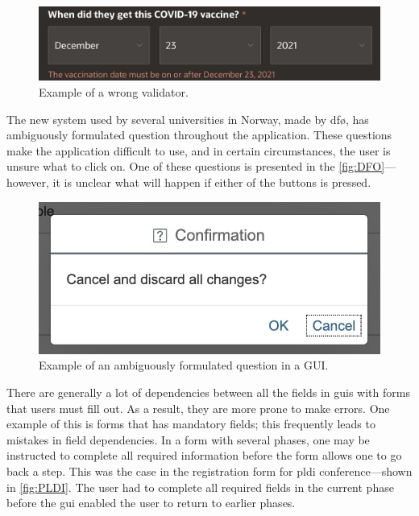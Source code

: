 \begin{figure}
    \centering
    \includegraphics[scale=0.35, frame]{figures/vaccine.jpeg}
    \caption{Example of a wrong validator.}
    \label{fig:vaccine}
\end{figure}

The new system used by several universities in Norway, made by \gls{dfø}, has ambiguously formulated question throughout the application. These questions make the application difficult to use, and in certain circumstances, the user is unsure what to click on. One of these questions is presented in the \autoref{fig:DFO}---however, it is unclear what will happen if either of the buttons is pressed.

\begin{figure}[h]
    \centering
    \includegraphics[scale=0.55, frame]{figures/DFO.jpg}
    \caption{Example of an ambiguously formulated question in a GUI.}
    \label{fig:DFO}
\end{figure}

There are generally a lot of dependencies between all the fields in \gls{gui}s with forms that users must fill out. As a result, they are more prone to make errors. One example of this is forms that has mandatory fields; this frequently leads to mistakes in field dependencies. In a form with several phases, one may be instructed to complete all required information before the form allows one to go back a step. This was the case in the registration form for \gls{pldi} conference---shown in \autoref{fig:PLDI}. The user had to complete all required fields in the current phase before the \gls{gui} enabled the user to return to earlier phases. 

